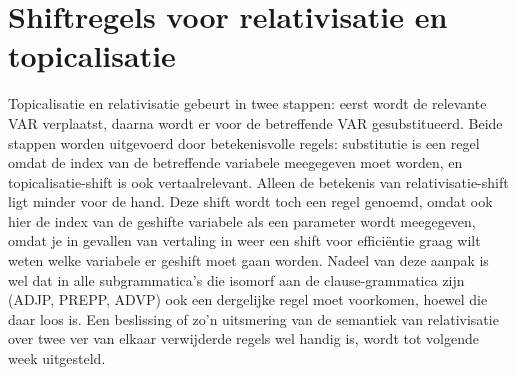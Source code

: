 \section{Shiftregels voor relativisatie en topicalisatie}
Topicalisatie en relativisatie gebeurt in twee stappen: eerst wordt de 
relevante VAR verplaatst, daarna wordt er voor de betreffende VAR 
gesubstitueerd. Beide stappen worden uitgevoerd door betekenisvolle regels: 
substitutie is een regel omdat de index van de betreffende variabele meegegeven 
moet worden, en topicalisatie-shift is ook vertaalrelevant. Alleen de betekenis 
van relativisatie-shift ligt minder voor de hand. Deze shift wordt toch een 
regel genoemd, omdat ook hier de index van de geshifte variabele als een 
parameter wordt meegegeven, omdat je in gevallen van vertaling in weer een 
shift voor effici\"{e}ntie graag wilt weten welke variabele er geshift moet 
gaan worden. Nadeel van deze aanpak is wel dat in alle subgrammatica's die 
isomorf aan de clause-grammatica zijn (ADJP, PREPP, ADVP) ook een dergelijke 
regel moet voorkomen, hoewel die daar loos is. Een beslissing of zo'n 
uitsmering van de semantiek van relativisatie over twee ver van elkaar 
verwijderde regels wel handig is, wordt tot volgende week uitgesteld.

